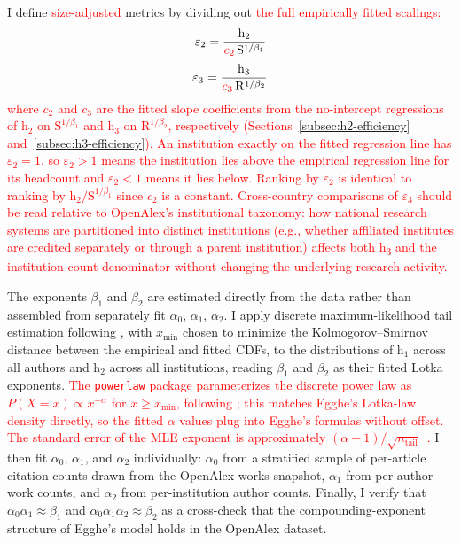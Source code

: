 I define \textcolor{red}{size-adjusted} metrics by dividing out \textcolor{red}{the full empirically fitted scalings:}
\begin{equation}
	\varepsilon_2 = \frac{\mathrm{h}_2}{\textcolor{red}{c_2\,}\mathrm{S}^{1/\beta_1}}
	\label{eq:eff2}
\end{equation}
\begin{equation}
	\varepsilon_3 = \frac{\mathrm{h}_3}{\textcolor{red}{c_3\,}\mathrm{R}^{1/\beta_2}}
	\label{eq:eff3}
\end{equation}
\textcolor{red}{where $c_2$ and $c_3$ are the fitted slope coefficients from the no-intercept regressions of $\mathrm{h}_2$ on $\mathrm{S}^{1/\beta_1}$ and $\mathrm{h}_3$ on $\mathrm{R}^{1/\beta_2}$, respectively (Sections~\ref{subsec:h2-efficiency} and~\ref{subsec:h3-efficiency}). An institution exactly on the fitted regression line has $\varepsilon_2 = 1$, so $\varepsilon_2 > 1$ means the institution lies above the empirical regression line for its headcount and $\varepsilon_2 < 1$ means it lies below. Ranking by $\varepsilon_2$ is identical to ranking by $\mathrm{h}_2/\mathrm{S}^{1/\beta_1}$ since $c_2$ is a constant. Cross-country comparisons of $\varepsilon_3$ should be read relative to OpenAlex's institutional taxonomy: how national research systems are partitioned into distinct institutions (e.g., whether affiliated institutes are credited separately or through a parent institution) affects both h\textsubscript{3} and the institution-count denominator without changing the underlying research activity.}

The exponents $\beta_1$ and $\beta_2$ are estimated directly from the data rather than assembled from separately fit $\alpha_0$, $\alpha_1$, $\alpha_2$. I apply discrete maximum-likelihood tail estimation following \citet{clauset2009}, with $x_\text{min}$ chosen to minimize the Kolmogorov--Smirnov distance between the empirical and fitted CDFs, to the distributions of $\mathrm{h}_1$ across all authors and $\mathrm{h}_2$ across all institutions, reading $\beta_1$ and $\beta_2$ as their fitted Lotka exponents. \textcolor{red}{The \texttt{powerlaw} package parameterizes the discrete power law as $P(X=x)\propto x^{-\alpha}$ for $x\geq x_{\min}$, following \citet{clauset2009}; this matches Egghe's Lotka-law density directly, so the fitted $\alpha$ values plug into Egghe's formulas without offset. The standard error of the MLE exponent is approximately $(\alpha-1)/\sqrt{n_\text{tail}}$~\citep{clauset2009}.} I then fit $\alpha_0$, $\alpha_1$, and $\alpha_2$ individually: $\alpha_0$ from a stratified sample of per-article citation counts drawn from the OpenAlex works snapshot, $\alpha_1$ from per-author work counts, and $\alpha_2$ from per-institution author counts. Finally, I verify that $\alpha_0\alpha_1 \approx \beta_1$ and $\alpha_0\alpha_1\alpha_2 \approx \beta_2$ as a cross-check that the compounding-exponent structure of Egghe's model holds in the OpenAlex dataset.

